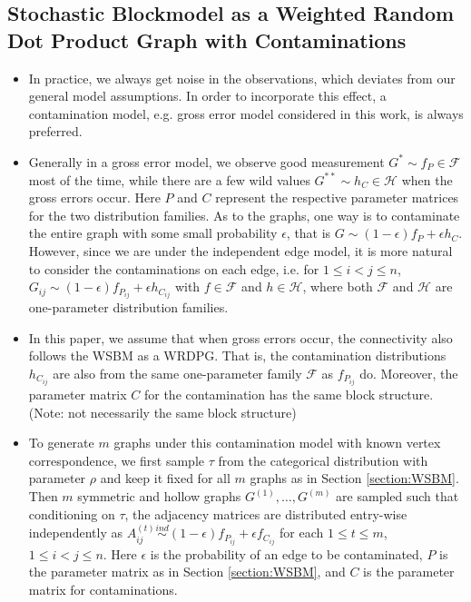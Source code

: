 \documentclass[a4paper]{article}
\begin{document}
\subsection{Stochastic Blockmodel as a Weighted Random Dot Product Graph with Contaminations}
\label{section:Contamination}
\begin{itemize}
\item In practice, we always get noise in the observations, which deviates from our general model assumptions. In order to incorporate this effect, a contamination model, e.g. gross error model \cite{AIC:AIC690280519, bickel2001mathematical} considered in this work, is always preferred.
\item Generally in a gross error model, we observe good measurement $G^* \sim f_P \in \mathcal{F}$ most of the time, while there are a few wild values $G^{**} \sim h_C \in \mathcal{H}$ when the gross errors occur. Here $P$ and $C$ represent the respective parameter matrices for the two distribution families.
As to the graphs, one way is to contaminate the entire graph with some small probability $\epsilon$, that is $G \sim (1-\epsilon) f_P + \epsilon h_C$. However, since we are under the independent edge model, it is more natural to consider the contaminations on each edge, i.e. for $1 \le i <  j \le n$, $G_{ij} \sim (1-\epsilon) f_{P_{ij}} + \epsilon h_{C_{ij}}$ with $f \in \mathcal{F}$ and $h \in \mathcal{H}$, where both $\mathcal{F}$ and $\mathcal{H}$ are one-parameter distribution families.
\item In this paper, we assume that when gross errors occur, the connectivity also follows the WSBM as a WRDPG. That is, the contamination distributions $h_{C_{ij}}$ are also from the same one-parameter family $\mathcal{F}$ as $f_{P_{ij}}$ do. Moreover, the parameter matrix $C$ for the contamination has the same block structure. (Note: not necessarily the same block structure)
\item To generate $m$ graphs under this contamination model with known vertex correspondence, we first sample $\tau$ from the categorical distribution with parameter $\rho$ and keep it fixed for all $m$ graphs as in Section \ref{section:WSBM}. Then $m$ symmetric and hollow graphs $G^{(1)}, \dotsc, G^{(m)}$ are sampled such that conditioning on $\tau$, the adjacency matrices are distributed entry-wise independently as $A^{(t)}_{ij} \stackrel{ind}{\sim} (1-\epsilon) f_{P_{ij}} + \epsilon f_{C_{ij}}$ for each $1 \le t \le m$, $1 \le i < j \le n$. Here $\epsilon$ is the probability of an edge to be contaminated, $P$ is the parameter matrix as in Section \ref{section:WSBM}, and $C$ is the parameter matrix for contaminations.
\end{itemize}
\end{document}
